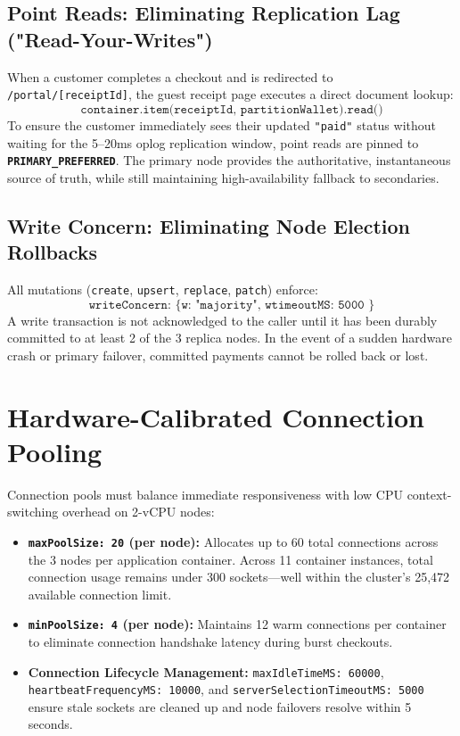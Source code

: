 \documentclass[11pt,a4paper]{article}
\begin{document}
\subsection{Point Reads: Eliminating Replication Lag ("Read-Your-Writes")}
When a customer completes a checkout and is redirected to \texttt{/portal/[receiptId]}, the guest receipt page executes a direct document lookup:
$$\texttt{container.item(receiptId, partitionWallet).read()}$$
To ensure the customer immediately sees their updated \texttt{"paid"} status without waiting for the 5--20ms oplog replication window, point reads are pinned to \textbf{\texttt{PRIMARY\_PREFERRED}}. The primary node provides the authoritative, instantaneous source of truth, while still maintaining high-availability fallback to secondaries.

\subsection{Write Concern: Eliminating Node Election Rollbacks}
All mutations (\texttt{create}, \texttt{upsert}, \texttt{replace}, \texttt{patch}) enforce:
$$\texttt{writeConcern: \{ w: "majority", wtimeoutMS: 5000 \}}$$
A write transaction is not acknowledged to the caller until it has been durably committed to at least 2 of the 3 replica nodes. In the event of a sudden hardware crash or primary failover, committed payments cannot be rolled back or lost.

\section{Hardware-Calibrated Connection Pooling}

Connection pools must balance immediate responsiveness with low CPU context-switching overhead on 2-vCPU nodes:

\begin{itemize}
    \item \textbf{\texttt{maxPoolSize: 20} (per node):} Allocates up to 60 total connections across the 3 nodes per application container. Across 11 container instances, total connection usage remains under 300 sockets---well within the cluster's 25,472 available connection limit.
    \item \textbf{\texttt{minPoolSize: 4} (per node):} Maintains 12 warm connections per container to eliminate connection handshake latency during burst checkouts.
    \item \textbf{Connection Lifecycle Management:} \texttt{maxIdleTimeMS: 60000}, \texttt{heartbeatFrequencyMS: 10000}, and \texttt{serverSelectionTimeoutMS: 5000} ensure stale sockets are cleaned up and node failovers resolve within 5 seconds.
\end{itemize}
\end{document}
